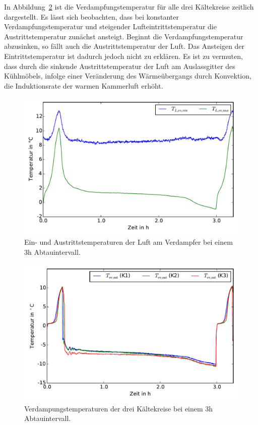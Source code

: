 In Abbildung~\ref{fig:Tevap51} ist die Verdampfungstemperatur für alle drei Kältekreise zeitlich dargestellt. Es lässt sich beobachten, dass bei konstanter Verdampfungstemperatur und steigender Lufteintrittstemperatur die Austrittstemperatur zunächst ansteigt. Beginnt die Verdampfungstemperatur abzusinken, so fällt auch die Austrittstemperatur der Luft. \newline Das Ansteigen der Eintrittstemperatur ist dadurch jedoch nicht zu erklären.
Es ist zu vermuten, dass durch die sinkende Austrittstemperatur der Luft am Auslassgitter des Kühlmöbels, infolge einer Veränderung des Wärmeübergangs durch Konvektion, die Induktionsrate der warmen Kammerluft erhöht.

\begin{figure}[h!]
\centering
\includegraphics[scale=0.8]{Pictures/51/T_air,evap.pdf}
\caption{Ein- und Austrittstemperaturen der Luft am Verdampfer bei einem 3h Abtauintervall.}
\label{fig:TLuftevap51}
\end{figure}

\begin{figure}[h!]
\centering
\includegraphics[scale=0.8]{Pictures/51/Tsats_K1K2K3lastCycle.pdf}
\caption{Verdampungstemperaturen der drei Kältekreise bei einem 3h Abtauintervall.}
\label{fig:Tevap51}
\end{figure}



